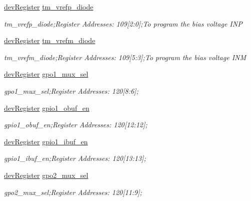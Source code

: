\begin{DoxyCompactItemize}
\mbox{\hyperlink{classdev_register}{dev\+Register}} \mbox{\hyperlink{class_o_p_t3101_registers_afbaca0aecb35d0f114f34ce5a9de469a}{tm\+\_\+vrefp\+\_\+diode}}
\begin{DoxyCompactList}\small\item\em tm\+\_\+vrefp\+\_\+diode;Register Addresses\+: 109\mbox{[}2\+:0\mbox{]};To program the bias voltage I\+NP \end{DoxyCompactList}\item 
\mbox{\hyperlink{classdev_register}{dev\+Register}} \mbox{\hyperlink{class_o_p_t3101_registers_af2f334100a90c93956c397dc752a89d4}{tm\+\_\+vrefm\+\_\+diode}}
\begin{DoxyCompactList}\small\item\em tm\+\_\+vrefm\+\_\+diode;Register Addresses\+: 109\mbox{[}5\+:3\mbox{]};To program the bias voltage I\+NM \end{DoxyCompactList}\item 
\mbox{\hyperlink{classdev_register}{dev\+Register}} \mbox{\hyperlink{class_o_p_t3101_registers_a3b1789f3a9d92591b56bf9ab446dc6fd}{gpo1\+\_\+mux\+\_\+sel}}
\begin{DoxyCompactList}\small\item\em gpo1\+\_\+mux\+\_\+sel;Register Addresses\+: 120\mbox{[}8\+:6\mbox{]}; \end{DoxyCompactList}\item 
\mbox{\hyperlink{classdev_register}{dev\+Register}} \mbox{\hyperlink{class_o_p_t3101_registers_ac01ee57ca57e9b4d0524cefadd0d076b}{gpio1\+\_\+obuf\+\_\+en}}
\begin{DoxyCompactList}\small\item\em gpio1\+\_\+obuf\+\_\+en;Register Addresses\+: 120\mbox{[}12\+:12\mbox{]}; \end{DoxyCompactList}\item 
\mbox{\hyperlink{classdev_register}{dev\+Register}} \mbox{\hyperlink{class_o_p_t3101_registers_a50296cb1f35a6efd1a5b897d3522298f}{gpio1\+\_\+ibuf\+\_\+en}}
\begin{DoxyCompactList}\small\item\em gpio1\+\_\+ibuf\+\_\+en;Register Addresses\+: 120\mbox{[}13\+:13\mbox{]}; \end{DoxyCompactList}\item 
\mbox{\hyperlink{classdev_register}{dev\+Register}} \mbox{\hyperlink{class_o_p_t3101_registers_a1b5313e99a366c95aae959bdbcf09c0d}{gpo2\+\_\+mux\+\_\+sel}}
\begin{DoxyCompactList}\small\item\em gpo2\+\_\+mux\+\_\+sel;Register Addresses\+: 120\mbox{[}11\+:9\mbox{]}; \end{DoxyCompactList}\item 

\end{DoxyCompactItemize}
